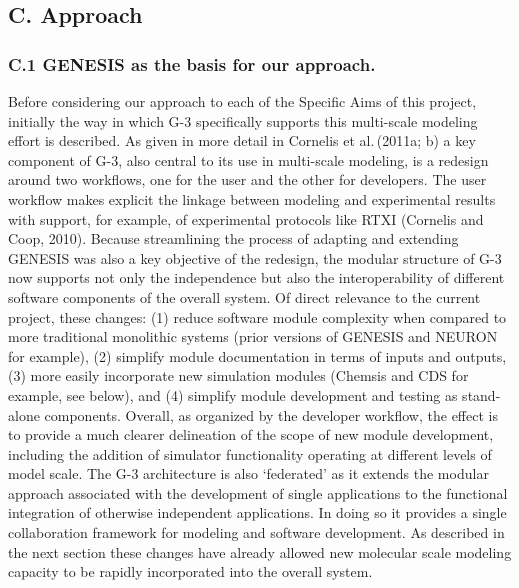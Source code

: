 \documentclass[12pt]{article}
\begin{document}
\subsection*{C. Approach}

\subsubsection*{C.1 GENESIS as the basis for our approach.}

\noindent Before considering our approach to each of the Specific Aims
of this project, initially the way in which G-3 specifically supports
this multi-scale modeling effort is described.  As given in more detail in Cornelis et al.\,(2011a; b) a key component
of G-3, also central to its use in multi-scale modeling, is a redesign
around two workflows, one for the user and the other for developers.
The user workflow makes explicit the linkage between modeling and
experimental results with support, for example, of experimental
protocols like RTXI (Cornelis and Coop, 2010).  Because streamlining
the process of adapting and extending GENESIS was also a key objective
of the redesign, the modular structure of G-3 now supports not only
the independence but also the interoperability of different software
components of the overall system. Of direct relevance to the current
project, these changes: (1) reduce software module complexity when
compared to more traditional monolithic systems (prior versions of
GENESIS and NEURON for example), (2) simplify module documentation in
terms of inputs and outputs, (3) more easily incorporate new
simulation modules (Chemsis and CDS for example, see below), and (4)
simplify module development and testing as stand-alone components.
Overall, as organized by the developer workflow, the effect is to
provide a much clearer delineation of the scope of new module
development, including the
addition of simulator functionality operating at different levels of
model scale.  The G-3 architecture is also `federated' as it extends
the modular approach associated with the development of single
applications to the functional integration of otherwise independent
applications. In doing so it provides a single collaboration framework
for modeling and software development. As described in the next
section these changes have already allowed new molecular scale
modeling capacity to be rapidly incorporated into the overall
system.\\ %
\end{document}
